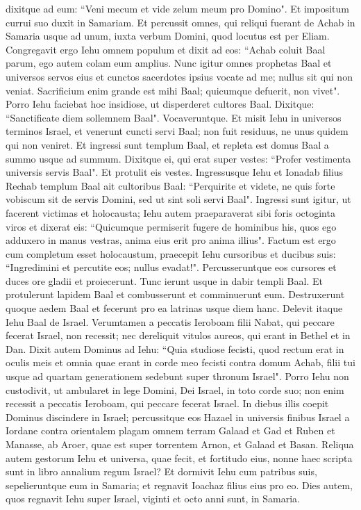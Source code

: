 \begin{biblechapter}
\verse dixitque ad eum: “Veni mecum et vide zelum meum pro Domino". Et impositum currui suo 
\verse duxit in Samariam. Et percussit omnes, qui reliqui fuerant de Achab in Samaria usque ad unum, iuxta verbum Domini, quod locutus est per Eliam. 
\verse Congregavit ergo Iehu omnem populum et dixit ad eos: “Achab coluit Baal parum, ego autem colam eum amplius. 
\verse Nunc igitur omnes prophetas Baal et universos servos eius et cunctos sacerdotes ipsius vocate ad me; nullus sit qui non veniat. Sacrificium enim grande est mihi Baal; quicumque defuerit, non vivet". Porro Iehu faciebat hoc insidiose, ut disperderet cultores Baal. 
\verse Dixitque: “Sanctificate diem sollemnem Baal". Vocaveruntque. 
\verse Et misit Iehu in universos terminos Israel, et venerunt cuncti servi Baal; non fuit residuus, ne unus quidem qui non veniret. Et ingressi sunt templum Baal, et repleta est domus Baal a summo usque ad summum. 
\verse Dixitque ei, qui erat super vestes: “Profer vestimenta universis servis Baal". Et protulit eis vestes. 
\verse Ingressusque Iehu et Ionadab filius Rechab templum Baal ait cultoribus Baal: “Perquirite et videte, ne quis forte vobiscum sit de servis Domini, sed ut sint soli servi Baal". 
\verse Ingressi sunt igitur, ut facerent victimas et holocausta; Iehu autem praeparaverat sibi foris octoginta viros et dixerat eis: “Quicumque permiserit fugere de hominibus his, quos ego adduxero in manus vestras, anima eius erit pro anima illius". 
\verse Factum est ergo cum completum esset holocaustum, praecepit Iehu cursoribus et ducibus suis: “Ingredimini et percutite eos; nullus evadat!". Percusseruntque eos cursores et duces ore gladii et proiecerunt. Tunc ierunt usque in dabir templi Baal. 
\verse Et protulerunt lapidem Baal et combusserunt 
\verse et comminuerunt eum. Destruxerunt quoque aedem Baal et fecerunt pro ea latrinas usque diem hanc. 
\verse Delevit itaque Iehu Baal de Israel. 
\verse Verumtamen a peccatis Ieroboam filii Nabat, qui peccare fecerat Israel, non recessit; nec dereliquit vitulos aureos, qui erant in Bethel et in Dan. 
\verse Dixit autem Dominus ad Iehu: “Quia studiose fecisti, quod rectum erat in oculis meis et omnia quae erant in corde meo fecisti contra domum Achab, filii tui usque ad quartam generationem sedebunt super thronum Israel". 
\verse Porro Iehu non custodivit, ut ambularet in lege Domini, Dei Israel, in toto corde suo; non enim recessit a peccatis Ieroboam, qui peccare fecerat Israel. 
\verse In diebus illis coepit Dominus discindere in Israel; percussitque eos Hazael in universis finibus Israel 
\verse a Iordane contra orientalem plagam omnem terram Galaad et Gad et Ruben et Manasse, ab Aroer, quae est super torrentem Arnon, et Galaad et Basan. 
\verse Reliqua autem gestorum Iehu et universa, quae fecit, et fortitudo eius, nonne haec scripta sunt in libro annalium regum Israel? 
\verse Et dormivit Iehu cum patribus suis, sepelieruntque eum in Samaria; et regnavit Ioachaz filius eius pro eo. 
\verse Dies autem, quos regnavit Iehu super Israel, viginti et octo anni sunt, in Samaria. 
\end{biblechapter}

